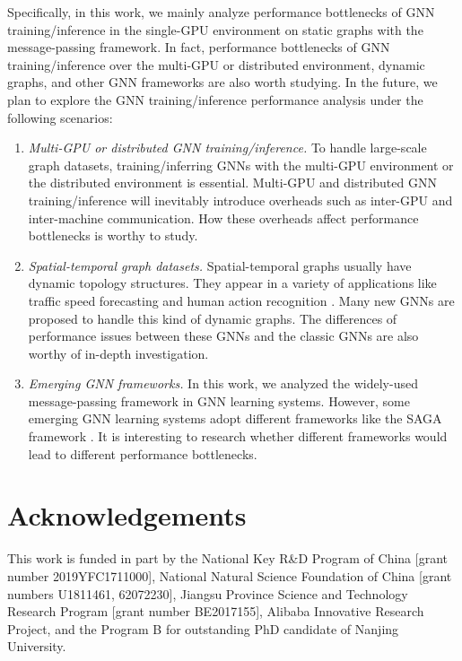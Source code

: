 Specifically, in this work, we mainly analyze performance bottlenecks of GNN training/inference in the single-GPU environment on static graphs with the message-passing framework.
%
In fact, performance bottlenecks of GNN training/inference over the multi-GPU or distributed environment, dynamic graphs, and other GNN frameworks are also worth studying.
%
In the future, we plan to explore the GNN training/inference performance analysis under the following scenarios:
%
\begin{enumerate}
    \item \emph{Multi-GPU or distributed GNN training/inference.}
    To handle large-scale graph datasets, training/inferring GNNs with the multi-GPU environment or the distributed environment is essential.
    Multi-GPU and distributed GNN training/inference will inevitably introduce overheads such as inter-GPU and inter-machine communication. 
    How these overheads affect performance bottlenecks is worthy to study.
    \item \emph{Spatial-temporal graph datasets.}
    Spatial-temporal graphs usually have dynamic topology structures.
    They appear in a variety of applications like traffic speed forecasting \cite{li2018_DCRNN} and human action recognition \cite{yan2018_STGCN}.
    Many new GNNs are proposed to handle this kind of dynamic graphs.
    The differences of performance issues between these GNNs and the classic GNNs are also worthy of in-depth investigation.
    \item \emph{Emerging GNN frameworks.}
    In this work, we analyzed the widely-used message-passing framework in GNN learning systems.
    However, some emerging GNN learning systems adopt different frameworks like the SAGA framework \cite{ma2019_neugraph}.
    It is interesting to research whether different frameworks would lead to different performance bottlenecks.
\end{enumerate}

\section*{Acknowledgements}

This work is funded in part by the National Key R\&D Program of China [grant number 2019YFC1711000], National Natural Science Foundation of China [grant numbers U1811461, 62072230], Jiangsu Province Science and Technology Research Program [grant number BE2017155], Alibaba Innovative Research Project, and the Program B for outstanding PhD candidate of Nanjing University.

